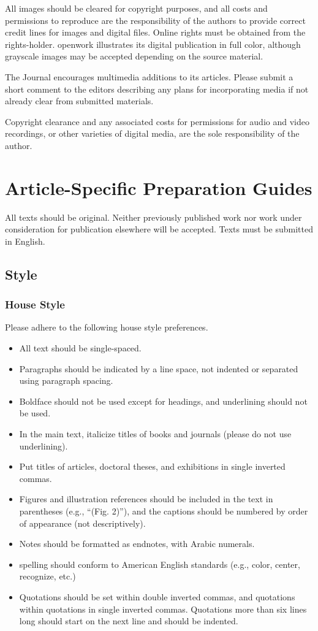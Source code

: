 \documentclass[12pt]{article}
\begin{document}
All images should be cleared for copyright purposes, and all costs and permissions to reproduce are the responsibility of the authors to provide correct credit lines for images and digital files. Online rights must be obtained from the rights-holder. openwork illustrates its digital publication in full color, although grayscale images may be accepted depending on the source material.

The Journal encourages multimedia additions to its articles. Please submit a short comment to the editors describing any plans for incorporating media if not already clear from submitted materials.

Copyright clearance and any associated costs for permissions for audio and video recordings, or other varieties of digital media, are the sole responsibility of the author.

\section*{Article-Specific Preparation Guides}

All texts should be original. Neither previously published work nor work under consideration for publication elsewhere will be accepted. Texts must be submitted in English.

\subsection{Style}

\subsubsection{House Style}
Please adhere to the following house style preferences.
\begin{itemize}[noitemsep]
    \item All text should be single-spaced.
    \item Paragraphs should be indicated by a line space, not indented or separated using paragraph spacing.
    \item Boldface should not be used except for headings, and underlining should not be used.
    \item In the main text, italicize titles of books and journals (please do not use underlining).
    \item Put titles of articles, doctoral theses, and exhibitions in single inverted commas.
    \item Figures and illustration references should be included in the text in parentheses (e.g., “(Fig. 2)”), and the captions should be numbered by order of appearance (not descriptively).
	\item Notes should be formatted as endnotes, with Arabic numerals.
    \item spelling should conform to American English standards (e.g., color, center, recognize, etc.)
    \item Quotations should be set within double inverted commas, and quotations within quotations in single inverted commas. Quotations more than six lines long should start on the next line and should be indented.
\end{itemize}
\end{document}
